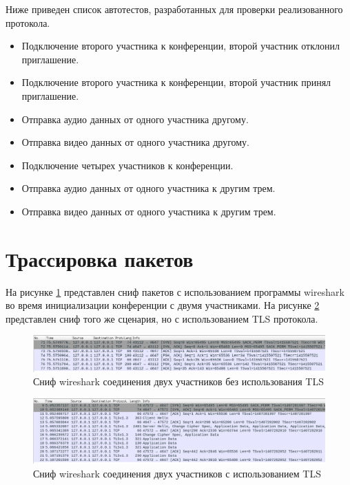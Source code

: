 Ниже приведен список автотестов, разработанных для проверки реализованного протокола. 

\begin{itemize}[label=---]
  \item Подключение второго участника к конференции, второй участник отклонил приглашение.
  \item Подключение второго участника к конференции, второй участник принял приглашение.
  \item Отправка аудио данных от одного участника другому.
  \item Отправка видео данных от одного участника другому.
  \item Подключение четырех участников к конференции.
  \item Отправка аудио данных от одного участника к другим трем.
  \item Отправка видео данных от одного участника к другим трем.
\end{itemize}

\section{Трассировка пакетов}

На рисунке \ref{img:trace-conf-2} представлен сниф пакетов с использованием программы wireshark \cite{wireshark} во время инициализации конференции с двумя участниками.
На рисунке \ref{img:trace-conf-2-tls} представлен сниф того же сценария, но с использованием TLS протокола.

\begin{figure}[h!]
  \centering
  \includegraphics[width=\linewidth]{inc/img/trace-conf-2.png}
  \caption{Сниф wireshark соединения двух участников без использования TLS}
  \label{img:trace-conf-2}
\end{figure}

\begin{figure}[h!]
  \centering
  \includegraphics[width=\linewidth]{inc/img/trace-conf-2-tls.png}
  \caption{Сниф wireshark соединения двух участников с использованием TLS}
  \label{img:trace-conf-2-tls}
\end{figure}

